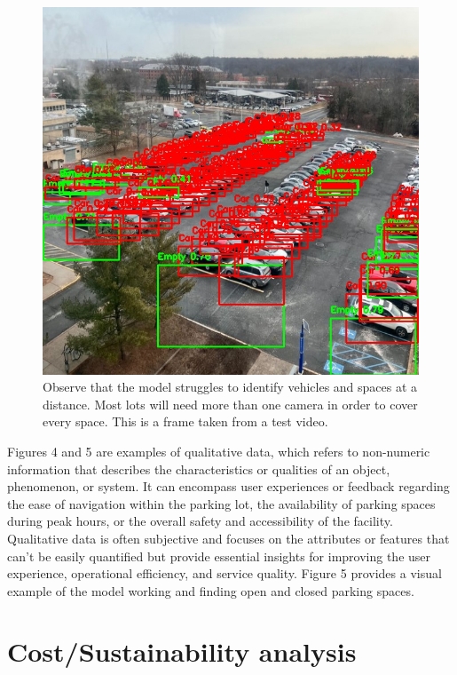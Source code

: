 \documentclass[conference]{IEEEtran}
\begin{document}
\begin{figure}[h]
    \centering
    \includegraphics[scale=0.4]{Figure_5.JPG}
    \caption{
        Observe that the model struggles to identify vehicles and spaces at a distance. 
        Most lots will need more than one camera in order to cover every space. 
        This is a frame taken from a test video.   
    }
    \label{fig:fig5}
\end{figure}

Figures 4 and 5 are examples of qualitative data, 
which refers to non-numeric information that describes the characteristics or qualities of an object, 
phenomenon, 
or system. 
It can encompass user experiences or feedback regarding the ease of navigation within the parking lot, 
the availability of parking spaces during peak hours, 
or the overall safety and accessibility of the facility. 
Qualitative data is often subjective and focuses on the attributes or features that can't be easily quantified but provide essential insights for improving the user experience, 
operational efficiency, 
and service quality. 
Figure 5 provides a visual example of the model working and finding open and closed parking spaces.

\section{Cost/Sustainability analysis}
\end{document}
